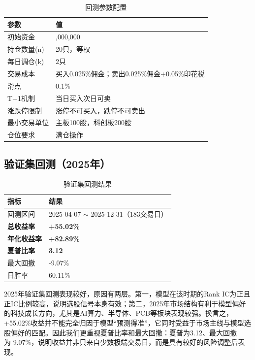 \documentclass[10pt,a4paper]{ctexart}
\begin{document}
\begin{table}[htbp]
    \centering
    \caption{回测参数配置}
    \begin{tabular}{ll}
        \toprule
        参数 & 值 \\
        \midrule
        初始资金 & \yen1,000,000 \\
        持仓数量(n) & 20只，等权 \\
        每日调仓(k) & 2只 \\
        交易成本 & 买入0.025\%佣金；卖出0.025\%佣金+0.05\%印花税 \\
        滑点 & 0.1\% \\
        T+1机制 & 当日买入次日可卖 \\
        涨跌停限制 & 涨停不可买入，跌停不可卖出 \\
        最小交易单位 & 主板100股，科创板200股 \\
        仓位要求 & 满仓操作 \\
        \bottomrule
    \end{tabular}
\end{table}

\subsection{验证集回测（2025年）}

\begin{table}[htbp]
    \centering
    \caption{验证集回测结果}
    \begin{tabular}{ll}
        \toprule
        指标 & 结果 \\
        \midrule
        回测区间 & 2025-04-07 $\sim$ 2025-12-31（183交易日） \\
        \textbf{总收益率} & \textbf{+55.02\%} \\
        \textbf{年化收益率} & \textbf{+82.89\%} \\
        \textbf{夏普比率} & \textbf{3.12} \\
        最大回撤 & -9.07\% \\
        日胜率 & 60.11\% \\
        \bottomrule
    \end{tabular}
\end{table}

2025年验证集回测表现较好，原因有两层。第一，模型在该时期的Rank IC为正且正IC比例较高，说明选股信号本身有效；第二，2025年市场结构有利于模型偏好的科技成长方向，尤其是AI算力、半导体、PCB等板块表现较强。换言之，+55.02\%收益并不能完全归因于模型“预测得准”，它同时受益于市场主线与模型选股偏好的匹配。因此我们更重视夏普比率和最大回撤：夏普为3.12、最大回撤为-9.07\%，说明收益并非只来自少数极端交易日，而是具有较好的风险调整后表现。
\end{document}
